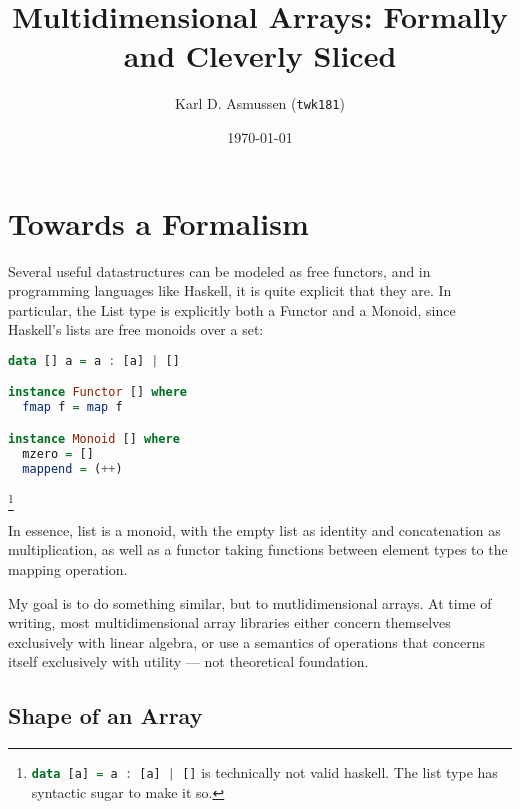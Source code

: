 \documentclass[a4paper,11pt,notitlepage]{article}
\author{Karl D. Asmussen (\texttt{twk181})}
\date{\today}
\title{Multidimensional Arrays: Formally and Cleverly Sliced}
\begin{document}

\section{Towards a Formalism}
\label{sec:to-form}

Several useful datastructures can be modeled as free functors, and in programming
languages like Haskell, it is quite explicit that they are. In particular, the List
type is explicitly both a Functor and a Monoid, since Haskell's lists are free monoids over
a set:

\begin{lstlisting}[style=Normal,language=Haskell]
data [] a = a : [a] | []

instance Functor [] where
  fmap f = map f

instance Monoid [] where
  mzero = []
  mappend = (++)
\end{lstlisting}\footnote{\lstinline[style=Normal,language=Haskell]{data [a] = a : [a] | []} is technically
not valid haskell. The list type has syntactic sugar to make it so.}

In essence, list is a monoid, with the empty list as identity and concatenation as multiplication, as well
as a functor taking functions between element types to the mapping operation.

My goal is to do something similar, but to mutlidimensional arrays. At time of writing, most multidimensional
array libraries either concern themselves exclusively with linear algebra, or use a semantics of operations that
concerns itself exclusively with utility --- not theoretical foundation.

\subsection{Shape of an Array}
\label{sub:shape}
\end{document}
